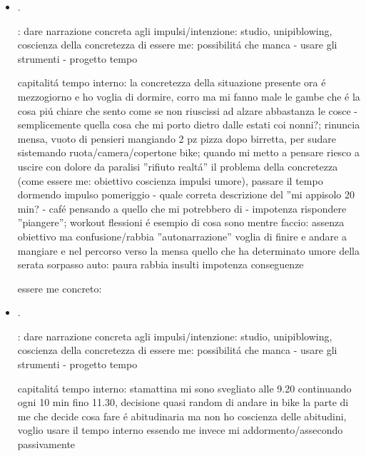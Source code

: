 \begin{itemize}
essere me concreto: fatica parlare genitori: ascoltare/raccontare; studio senza organizzazione/obiettivo - sento la fatica mentre faccio workout punch pensiero a finire senza la concretezza dell'obiettivo, l'affanno confusione del pike compression fatto al punto critico

\item {}.

: dare narrazione concreta agli impulsi/intenzione: studio, unipiblowing, coscienza della concretezza di essere me: possibilit\'a che manca - usare gli strumenti - progetto tempo 

capitalit\'a tempo interno: la concretezza della situazione presente ora \'e mezzogiorno e ho voglia di dormire, corro ma mi fanno male le gambe che \'e la cosa pi\'u chiare che sento come se non riuscissi ad alzare abbastanza le cosce - semplicemente quella cosa che mi porto dietro dalle estati coi nonni?; rinuncia mensa, vuoto di pensieri mangiando 2 pz pizza dopo birretta, per sudare sistemando ruota/camera/copertone bike; quando mi metto a pensare riesco a uscire con dolore da paralisi ''rifiuto realt\'a'' il problema della concretezza (come essere me: obiettivo coscienza impulsi umore), passare il tempo dormendo impulso pomeriggio - quale correta descrizione del ''mi appisolo 20 min? - caf\'e pensando a quello che mi potrebbero di - impotenza rispondere ''piangere''; workout flessioni \'e esempio di cosa sono mentre faccio: assenza obiettivo ma confusione/rabbia ''autonarrazione'' voglia di finire e andare a mangiare e nel percorso verso la mensa quello che ha determinato umore della serata sorpasso auto: paura rabbia insulti impotenza conseguenze

essere me concreto:

\item {}.

: dare narrazione concreta agli impulsi/intenzione: studio, unipiblowing, coscienza della concretezza di essere me: possibilit\'a che manca - usare gli strumenti - progetto tempo

capitalit\'a tempo interno: stamattina mi sono svegliato alle 9.20 continuando ogni 10 min fino 11.30, decisione quasi random di andare in bike la parte di me che decide cosa fare \'e abitudinaria ma non ho coscienza delle abitudini, voglio usare il tempo interno essendo me invece mi addormento/assecondo passivamente


\end{itemize}
